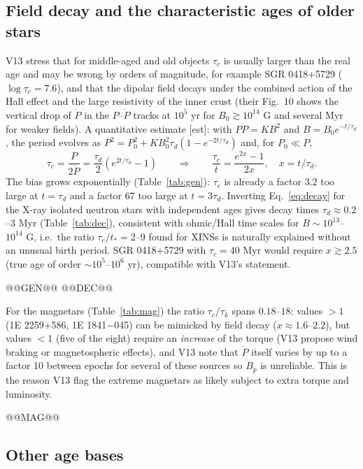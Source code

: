 \documentclass[11pt,a4paper]{article}
\newcommand{\src}[1]{\textsf{[#1]}}
\begin{document}
\subsection{Field decay and the characteristic ages of older stars}\label{sec:decay}
V13 stress that for middle-aged and old objects $\tau_c$ is usually larger than the real age and may be wrong by orders of magnitude, for example SGR 0418+5729 ($\log\tau_c=7.6$), and that the dipolar field decays under the combined action of the Hall effect and the large resistivity of the inner crust (their Fig.~10 shows the vertical drop of $\dot P$ in the $P$--$\dot P$ tracks at $10^5$ yr for $B_0\gtrsim10^{14}$ G and several Myr for weaker fields). A quantitative estimate \src{est}: with $P\dot P=KB^2$ and $B=B_0e^{-t/\tau_d}$, the period evolves as $P^2=P_0^2+KB_0^2\tau_d(1-e^{-2t/\tau_d})$ and, for $P_0\ll P$,
\begin{equation}\label{eq:decay}
\tau_c=\frac{P}{2\dot P}=\frac{\tau_d}{2}\left(e^{2t/\tau_d}-1\right)\qquad\Rightarrow\qquad \frac{\tau_c}{t}=\frac{e^{2x}-1}{2x},\quad x=t/\tau_d .
\end{equation}
The bias grows exponentially (Table~\ref{tab:gen}): $\tau_c$ is already a factor $3.2$ too large at $t=\tau_d$ and a factor $67$ too large at $t=3\tau_d$. Inverting Eq.~\eqref{eq:decay} for the X-ray isolated neutron stars with independent ages gives decay times $\tau_d\approx0.2$--$3$ Myr (Table~\ref{tab:dec}), consistent with ohmic/Hall time scales for $B\sim10^{13}$--$10^{14}$ G, i.e.\ the ratio $\tau_c/t_*=2$--9 found for XINSs is naturally explained without an unusual birth period. SGR 0418+5729 with $\tau_c=40$ Myr would require $x\gtrsim2.5$ (true age of order $\sim10^5$--$10^6$ yr), compatible with V13's statement.

@@GEN@@
@@DEC@@

For the magnetars (Table~\ref{tab:mag}) the ratio $\tau_c/\tau_k$ spans $0.18$--$18$: values $>1$ (1E 2259+586, 1E 1841$-$045) can be mimicked by field decay ($x\approx1.6$--$2.2$), but values $<1$ (five of the eight) require an \emph{increase} of the torque (V13 propose wind braking or magnetospheric effects), and V13 note that $\dot P$ itself varies by up to a factor 10 between epochs for several of these sources so $B_p$ is unreliable. This is the reason V13 flag the extreme magnetars as likely subject to extra torque and luminosity.

@@MAG@@

\subsection{Other age bases}
\end{document}
